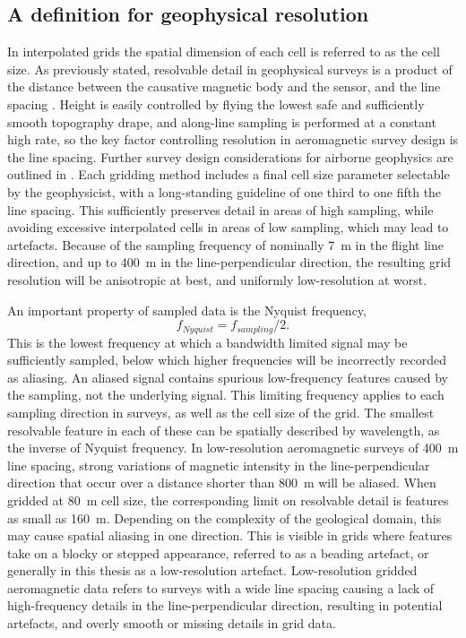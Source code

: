\subsection{A definition for geophysical resolution}
In interpolated grids the spatial dimension of each cell is referred to as the cell size.
As previously stated, resolvable detail in geophysical surveys is a product of the distance between the causative magnetic body and the sensor, and the line spacing \parencite{islesRelationshipsGeologicalResolution1992,islesGeologicalInterpretationAeromagnetic2018,dentithGeophysicsMineralExploration2014}.
Height is easily controlled by flying the lowest safe and sufficiently smooth topography drape, and along-line sampling is performed at a constant high rate, so the key factor controlling resolution in aeromagnetic survey design is the line spacing.
Further survey design considerations for airborne geophysics are outlined in \textcite{goodwinAirborneMagneticRadiometric2023,islesGeologicalInterpretationAeromagnetic2018,reidAeromagneticSurveyDesign1980}.
Each gridding method includes a final cell size parameter selectable by the geophysicist, with a long-standing guideline of one third to one fifth the line spacing.
This sufficiently preserves detail in areas of high sampling, while avoiding excessive interpolated cells in areas of low sampling, which may lead to artefacts.
Because of the sampling frequency of nominally \qty{7}{\m} in the flight line direction, and  up to \qty{400}{\m} in the line-perpendicular direction, the resulting grid resolution will be anisotropic at best, and uniformly low-resolution at worst.

An important property of sampled data is the Nyquist frequency, \[f_{Nyquist} = f_{sampling} / 2.\]
This is the lowest frequency at which a bandwidth limited signal may be sufficiently sampled, below which higher frequencies will be incorrectly recorded as aliasing.
An aliased signal contains spurious low-frequency features caused by the sampling, not the underlying signal.
This limiting frequency applies to each sampling direction in surveys, as well as the cell size of the grid.
The smallest resolvable feature in each of these can be spatially described by wavelength, as the inverse of Nyquist frequency.
In low-resolution aeromagnetic surveys of \qty{400}{\m} line spacing, strong variations of magnetic intensity in the line-perpendicular direction  that occur over a distance shorter than \qty{800}{\m} will be aliased.
When gridded at \qty{80}{\m} cell size, the corresponding limit on resolvable detail is features as small as \qty{160}{\m}.
Depending on the complexity of the geological domain, this may cause spatial aliasing in one direction.
This is visible in grids where features take on a blocky or stepped appearance, referred to as a beading artefact, or generally in this thesis as a low-resolution artefact.
Low-resolution gridded aeromagnetic data refers to surveys with a wide line spacing causing a lack of high-frequency details in the line-perpendicular direction, resulting in potential artefacts, and overly smooth or missing details in grid data.


